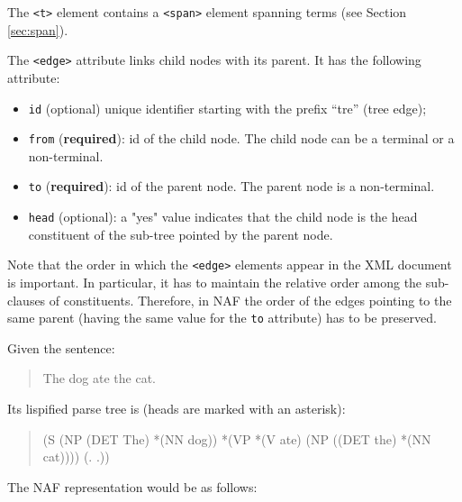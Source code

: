 The \texttt{<t>} element contains a \texttt{<span>} element spanning terms
(see Section \ref{sec:span}).

The \texttt{<edge>} attribute links child nodes with its parent. It has the
following attribute:

\begin{itemize}
\item \texttt{id} (optional) unique identifier starting with the
  prefix ``tre'' (tree edge);
\item \texttt{from} (\textbf{required}): id of the child node. The child node can be a terminal
  or a non-terminal.
\item \texttt{to} (\textbf{required}): id of the parent node. The parent
  node is a non-terminal.
\item \texttt{head} (optional): a "yes" value indicates that the child node
  is the head constituent of the sub-tree pointed by the parent node.
\end{itemize}

Note that the order in which the \texttt{<edge>} elements appear in the XML
document is important. In particular, it has to maintain the relative order
among the sub-clauses of constituents. Therefore, in NAF the order of the
edges pointing to the same parent (having the same value for the \texttt{to}
attribute) has to be preserved.

Given the sentence:

\begin{quote}
  The dog ate the cat.  
\end{quote}

Its lispified parse tree is (heads are marked with an asterisk):
\begin{quote}
  (S (NP (DET The) *(NN dog)) *(VP *(V ate) (NP ((DET the) *(NN cat)))) (. .))
\end{quote}

The NAF representation would be as follows:

